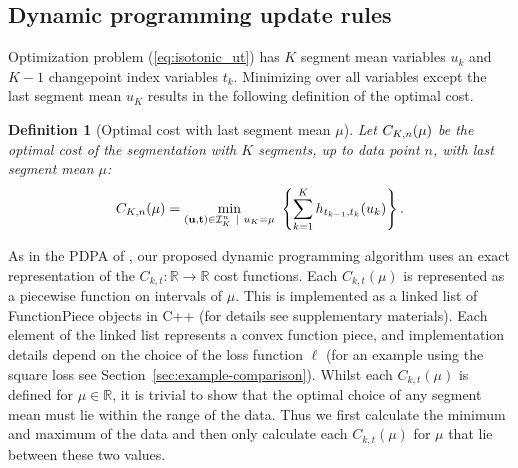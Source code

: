 \documentclass[aoas]{imsart}
\newtheorem{definition}{Definition}
\newcommand{\RR}{\mathbb R}
\begin{document}

\subsection{Dynamic programming update rules}
\label{sec:dyn-prog}
Optimization problem (\ref{eq:isotonic_ut}) has $K$ segment mean
variables $u_k$ and $K-1$ changepoint index variables $t_k$. Minimizing over all
variables except the last segment mean $u_K$ results in the following
definition of the optimal cost.



\begin{definition}[Optimal cost with last segment mean $\mu$]
\label{def:fcc}
  Let $C_{K,n}(\mu)$ be the optimal cost of the segmentation
  with $K$ segments, up to data point $n$, with last segment mean
  $\mu$:
\begin{equation}
\FCC_{K,n}(\mu) = \min_{(\mathbf u, \mathbf t)\in{\mathcal I}^n_K \ | \ u_K = \mu} \
  \left\{ \sum_{k=1}^K
  h_{t_{k-1}, t_k}(u_k) \right\}.
\end{equation}
\end{definition}

As in the PDPA of \citet{pruned-dp}, our proposed dynamic programming
algorithm uses an exact representation of the
$C_{k,t}:\RR\rightarrow\RR$ cost functions. Each $C_{k,t}(\mu)$ is
represented as a piecewise function on intervals of $\mu$. This is
implemented as a linked list of FunctionPiece objects in C++ (for
details see supplementary materials). Each element of the linked list
represents a convex function piece, and implementation details depend
on the choice of the loss function $\ell$ (for an example using the
square loss see Section~\ref{sec:example-comparison}). Whilst each
$C_{k,t}(\mu)$ is defined for $\mu \in \RR$, it is trivial to show
that the optimal choice of any segment mean must lie within the range
of the data. Thus we first calculate the minimum and maximum of the
data and then only calculate each $C_{k,t}(\mu)$ for $\mu$ that lie
between these two values.
\end{document}

